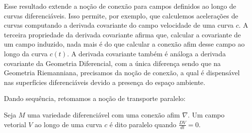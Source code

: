 Esse resultado extende a noção de conexão para campos definidos ao longo de curvas diferenciáveis. Isso permite, por exemplo, que calculemos acelerações de curvas computando a derivada covariante do campo velocidade de uma curva $c$.
A terceira propriedade da derivada covariante afirma que, calcular a covariante de um campo induzido, nada mais é do que calcular a conexão afim desse campo ao longo da curva $c(t)$. A derivada covariante também é análoga a derivada covariante da Geometria Diferencial, com a única diferença sendo que na Geometria Riemanniana, precisamos da noção de conexão, a qual é dispensável nas superfícies diferenciáveis devido a presença do espaço ambiente.

Dando sequência, retomamos a noção de transporte paralelo:
\begin{definition}
    \label{loc:2.5_:_def_3_:_paralelismo}
    Seja $M$ uma variedade diferenciável com uma conexão afim $\nabla$. Um campo vetorial $V$ ao longo de uma curva $c$ é dito paralelo quando $\frac{DV}{dt}=0$.
\end{definition}
